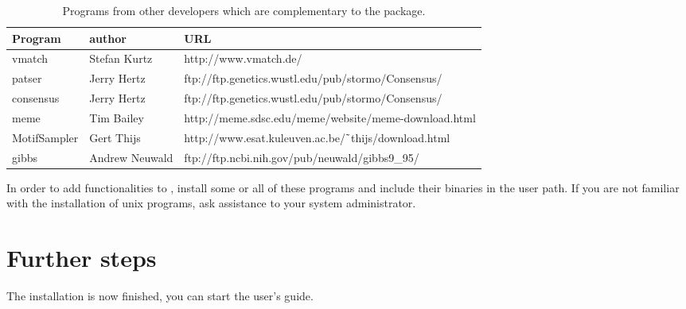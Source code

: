 \documentclass{article}
\begin{document}
\begin{table}
\begin{center}
\begin{tabular}{lll}
\hline
Program & author  & URL \\
\hline
vmatch & Stefan Kurtz & http://www.vmatch.de/ \\
patser & Jerry Hertz & ftp://ftp.genetics.wustl.edu/pub/stormo/Consensus/ \\
consensus & Jerry Hertz &  ftp://ftp.genetics.wustl.edu/pub/stormo/Consensus/ \\
meme & Tim Bailey & http://meme.sdsc.edu/meme/website/meme-download.html \\
MotifSampler & Gert Thijs & http://www.esat.kuleuven.ac.be/$\tilde{\hspace{0.4em}}$thijs/download.html \\
gibbs & Andrew Neuwald & ftp://ftp.ncbi.nih.gov/pub/neuwald/gibbs9\_95/ \\
\hline
\end{tabular}
\end{center}
\caption{\label{table:other_programs} Programs from other developers
  which are complementary to the \RSAT package.}
\end{table}

In order to add functionalities to \RSAT, install some or all of these
programs and include their binaries in the user path. If you are not
familiar with the installation of unix programs, ask assistance to
your system administrator.


\section{Further steps}

The installation is now finished, you can start the user's guide. 
\end{document}
